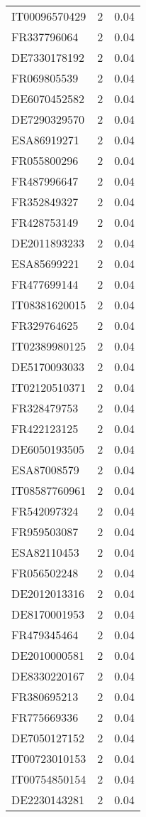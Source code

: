 \begin{table*}[htbp]
\begin{tabular}{lrr}
IT00096570429 & 2 & 0.04 \\
FR337796064 & 2 & 0.04 \\
DE7330178192 & 2 & 0.04 \\
FR069805539 & 2 & 0.04 \\
DE6070452582 & 2 & 0.04 \\
DE7290329570 & 2 & 0.04 \\
ESA86919271 & 2 & 0.04 \\
FR055800296 & 2 & 0.04 \\
FR487996647 & 2 & 0.04 \\
FR352849327 & 2 & 0.04 \\
FR428753149 & 2 & 0.04 \\
DE2011893233 & 2 & 0.04 \\
ESA85699221 & 2 & 0.04 \\
FR477699144 & 2 & 0.04 \\
IT08381620015 & 2 & 0.04 \\
FR329764625 & 2 & 0.04 \\
IT02389980125 & 2 & 0.04 \\
DE5170093033 & 2 & 0.04 \\
IT02120510371 & 2 & 0.04 \\
FR328479753 & 2 & 0.04 \\
FR422123125 & 2 & 0.04 \\
DE6050193505 & 2 & 0.04 \\
ESA87008579 & 2 & 0.04 \\
IT08587760961 & 2 & 0.04 \\
FR542097324 & 2 & 0.04 \\
FR959503087 & 2 & 0.04 \\
ESA82110453 & 2 & 0.04 \\
FR056502248 & 2 & 0.04 \\
DE2012013316 & 2 & 0.04 \\
DE8170001953 & 2 & 0.04 \\
FR479345464 & 2 & 0.04 \\
DE2010000581 & 2 & 0.04 \\
DE8330220167 & 2 & 0.04 \\
FR380695213 & 2 & 0.04 \\
FR775669336 & 2 & 0.04 \\
DE7050127152 & 2 & 0.04 \\
IT00723010153 & 2 & 0.04 \\
IT00754850154 & 2 & 0.04 \\
DE2230143281 & 2 & 0.04 \\

\end{tabular}
\end{table*}
